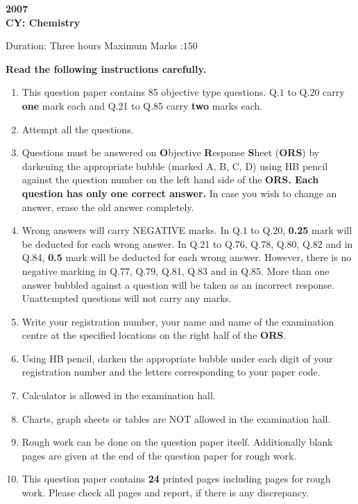 \documentclass[journal,12pt,onecolumn]{exam}
\theoremstyle{remark}
\begin{document}
\begin{center}
    \textbf{2007} \\[5pt]
    \textbf{CY: Chemistry} \\[10pt]
\end{center}
Duration: Three hours \hfill Maximum Marks :$150$
\vspace{0.5 cm}

\centering \textbf{Read the following instructions carefully.}



\begin{enumerate}
\item This question paper contains 85 objective type questions. Q.$1$ to Q.$20$ carry \textbf{one} mark
each and Q.21 to Q.85 carry \textbf{two} marks each.
\item Attempt all the questions.
\item  Questions must be answered on \textbf{O}bjective \textbf{R}esponse \textbf{S}heet (\textbf{ORS}) by darkening the
appropriate bubble (marked A, B, C, D) using HB pencil against the question number on
the left hand side of the \textbf{ ORS. Each question has only one correct answer.}  In case you
wish to change an answer, erase the old answer completely.
\item Wrong answers will carry NEGATIVE marks. In Q.$1$ to Q.$20$, \textbf{0.25} mark will be
deducted for each wrong answer. In Q.21 to Q.76, Q.78, Q.80, Q.82 and in Q.84, \textbf{0.5}
mark will be deducted for each wrong answer. However, there is no negative marking in
Q.77, Q.79, Q.81, Q.83 and in Q.85. More than one answer bubbled against a question
will be taken as an incorrect response. Unattempted questions will not carry any marks.
\item  Write your registration number, your name and name of the examination centre at the
specified locations on the right half of the \textbf{ORS}.
\item Using HB pencil, darken the appropriate bubble under each digit of your registration
number and the letters corresponding to your paper code.
\item Calculator is allowed in the examination hall.
\item Charts, graph sheets or tables are NOT allowed in the examination hall.
\item Rough work can be done on the question paper itself. Additionally blank pages are given
at the end of the question paper for rough work.
\item This question paper contains \textbf{24} printed pages including pages for rough work. Please
check all pages and report, if there is any discrepancy.
\end{enumerate}
\end{document}
